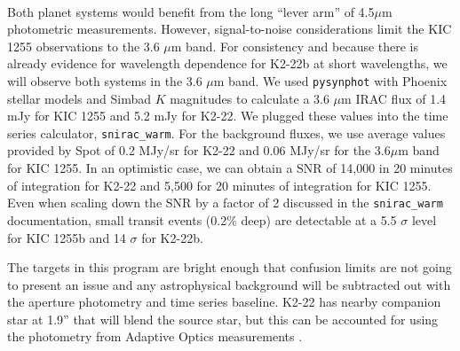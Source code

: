 \documentclass[letterpaper,12pt]{article}
\begin{document}
\\
Both planet systems would benefit from the long ``lever arm'' of 4.5$\mu$m photometric measurements. However, signal-to-noise considerations limit the KIC 1255 observations to the 3.6 $\mu$m band.
For consistency and because there is already evidence for wavelength dependence for K2-22b at short wavelengths, we will observe both systems in the 3.6 $\mu$m band.
We used \texttt{pysynphot} with Phoenix stellar models and Simbad $K$ magnitudes to calculate a 3.6 $\mu$m IRAC flux of 1.4 mJy for KIC 1255 and 5.2 mJy for K2-22.
We plugged these values into the time series calculator, \texttt{snirac\_warm}.
For the background fluxes, we use average values provided by Spot of 0.2 MJy/sr for K2-22 and 0.06 MJy/sr for the 3.6$\mu$m band for KIC 1255.
In an optimistic case, we can obtain a SNR of 14,000 in 20 minutes of integration for K2-22 and 5,500 for 20 minutes of integration for KIC 1255.
Even when scaling down the SNR by a factor of 2 discussed in the \texttt{snirac\_warm} documentation, small transit events (0.2\% deep) are detectable at a 5.5 $\sigma$ level for KIC 1255b and 14 $\sigma$ for K2-22b.

The targets in this program are bright enough that confusion limits are not going to present an issue and any astrophysical background will be subtracted out with the aperture photometry and time series baseline. K2-22 has nearby companion star at 1.9'' that will blend the source star, but this can be accounted for using the photometry from Adaptive Optics measurements \citep{sanchis-ojedak2-22}.\newline
\end{document}

